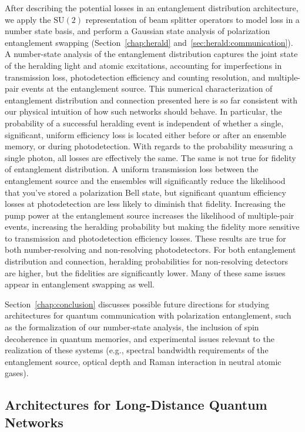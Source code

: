 \documentclass[aps,twocolumn,secnumarabic,amsmath,amssymb,pra,groupedaddress,
showpacs, showkeys]{revtex4-1}
\newcommand{\pna}[1]{\left(#1\right)}
\begin{document}
After describing the potential losses in an entanglement distribution
architecture, we apply the $\textrm{SU}\pna{2}$ representation of beam splitter
operators to model loss in a number state basis, and perform a Gaussian state
analysis of polarization entanglement swapping (Section~\ref{chap:herald}
and~\ref{sec:herald:communication}). A number-state analysis of the
entanglement distribution captures the joint state of the heralding light and
atomic excitations, accounting for imperfections in transmission loss,
photodetection efficiency and counting resolution, and multiple-pair events at
the entanglement source. This numerical characterization of entanglement
distribution and connection presented here is so far consistent with our
physical intuition of how such networks should behave. In particular, the
probability of a successful heralding event is independent of whether a single,
significant, uniform efficiency loss is located either before or after an
ensemble memory, or during photodetection. With regards to the probability
measuring a single photon, all losses are effectively the same. The same is not
true for fidelity of entanglement distribution. A uniform transmission loss
between the entanglement source and the ensembles will significantly reduce the
likelihood that you've stored a polarization Bell state, but significant
quantum efficiency losses at photodetection are less likely to diminish that
fidelity. Increasing the pump power at the entanglement source increases the
likelihood of multiple-pair events, increasing the heralding probability but
making the fidelity more sensitive to transmission and photodetection
efficiency losses. These results are true for both number-resolving and
non-resolving photodetectors. For both entanglement distribution and
connection, heralding probabilities for non-resolving detectors are higher, but
the fidelities are significantly lower. Many of these same issues appear in
entanglement swapping as well.

Section~\ref{chap:conclusion} discusses possible future directions for studying
architectures for quantum communication with polarization entanglement, such as
the formalization of our number-state analysis, the inclusion of spin
decoherence in quantum memories, and experimental issues relevant to the
realization of these systems (e.g., spectral bandwidth requirements of the
entanglement source, optical depth and Raman interaction in neutral atomic
gases).

\subsection{Architectures for Long-Distance Quantum Networks\label{sec:intro:architectures}}
\end{document}
